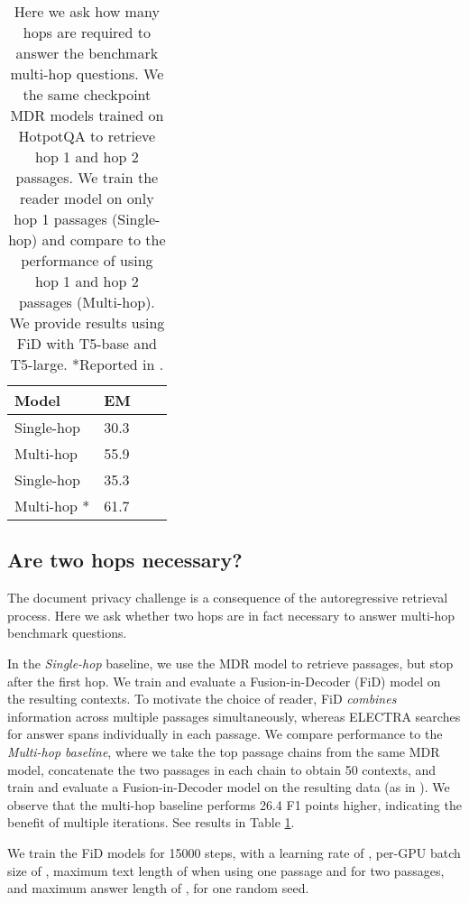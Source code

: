 \documentclass{article}
\renewcommand\cite{\citep}	\newcommand\shortcite{\citeyearpar}\newcommand\newcite{\citet}
\begin{document}
\begin{table}[t!]
    \begin{center}
    \normalsize
    \begin{tabular}{llcc}
    \toprule
    Model  &    EM  \\
    \midrule
    Single-hop     & 30.3  \\
    Multi-hop      & 55.9 \\
    Single-hop    & 35.3 \\
    Multi-hop  *  & 61.7 \\
    \bottomrule
    \end{tabular}
    \normalsize
    \caption{Here we ask how many hops are required to answer the benchmark multi-hop questions. We the same checkpoint MDR models trained on HotpotQA to retrieve hop 1 and hop 2 passages. We train the reader model on only hop 1 passages (Single-hop) and compare to the performance of using hop 1 and hop 2 passages (Multi-hop). We provide results using FiD with T5-base and T5-large. *Reported in \cite{xiong2021mdr}.}
    \vspace{2mm}
    \label{tab:fid}
    \end{center}
\end{table}

\subsection{Are two hops necessary?} The document privacy challenge is a consequence of the autoregressive retrieval process. Here we ask whether two hops are in fact necessary to answer multi-hop benchmark questions. 

In the \textit{Single-hop} baseline, we use the MDR model to retrieve  passages, but stop after the first hop. We train and evaluate a Fusion-in-Decoder (FiD) model \cite{izacard2021fid} on the resulting contexts. To motivate the choice of reader, FiD \textit{combines} information across multiple passages simultaneously, whereas ELECTRA searches for answer spans individually in each passage. We compare performance to the \textit{Multi-hop baseline}, where we take the top  passage chains from the same MDR model, concatenate the two passages in each chain to obtain 50 contexts, and train and evaluate a Fusion-in-Decoder model on the resulting data (as in \citet{xiong2021mdr}). We observe that the multi-hop baseline performs 26.4 F1 points higher, indicating the benefit of multiple iterations. See results in Table \ref{tab:fid}.

We train the FiD models for 15000 steps, with a learning rate of , per-GPU batch size of , maximum text length of  when using one passage and  for two passages, and maximum answer length of , for one random seed. 
\end{document}
